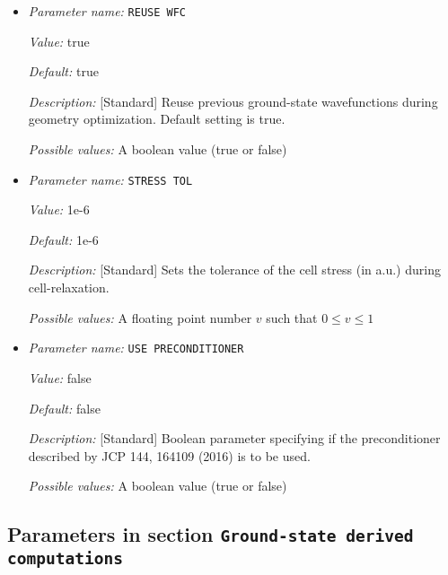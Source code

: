 \begin{itemize}
{\it Possible values:} An integer $n$ such that $0\leq n \leq 2$
\item {\it Parameter name:} {\tt REUSE WFC}
\label{parameters:Geometry/Optimization/REUSE WFC}
\label{parameters:Geometry/Optimization/REUSE_20WFC}


{\it Value:} true


{\it Default:} true


{\it Description:} [Standard] Reuse previous ground-state wavefunctions during geometry optimization. Default setting is true.


{\it Possible values:} A boolean value (true or false)
\item {\it Parameter name:} {\tt STRESS TOL}
\label{parameters:Geometry/Optimization/STRESS TOL}
\label{parameters:Geometry/Optimization/STRESS_20TOL}


{\it Value:} 1e-6


{\it Default:} 1e-6


{\it Description:} [Standard] Sets the tolerance of the cell stress (in a.u.) during cell-relaxation.


{\it Possible values:} A floating point number $v$ such that $0 \leq v \leq 1$
\item {\it Parameter name:} {\tt USE PRECONDITIONER}
\label{parameters:Geometry/Optimization/USE PRECONDITIONER}
\label{parameters:Geometry/Optimization/USE_20PRECONDITIONER}


{\it Value:} false


{\it Default:} false


{\it Description:} [Standard] Boolean parameter specifying if the preconditioner described by JCP 144, 164109 (2016) is to be used.


{\it Possible values:} A boolean value (true or false)
\end{itemize}

\subsection{Parameters in section \tt Ground-state derived computations}
\label{parameters:Ground_2dstate_20derived_20computations}

